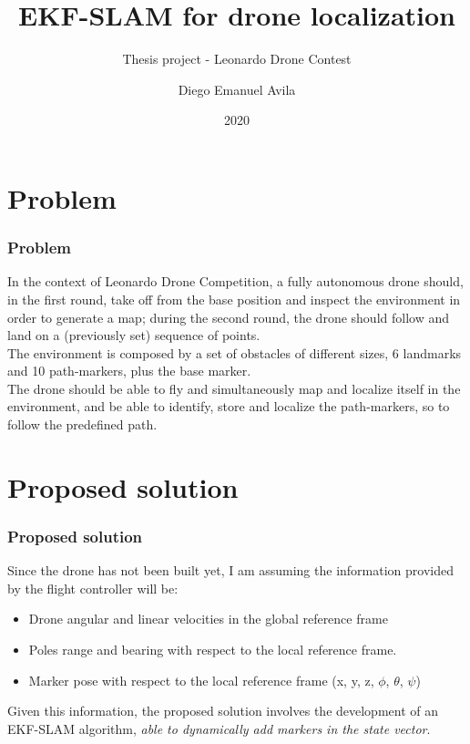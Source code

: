 \documentclass{beamer}
\title{EKF-SLAM for drone localization}
\subtitle{Thesis project - Leonardo Drone Contest}
\date{2020}
\author{Diego Emanuel Avila}
\begin{document}
    \begin{frame}
        \titlepage
    \end{frame}


    \begin{frame}
        \tableofcontents
    \end{frame}

    \section{Problem}
    \begin{frame}
        \justifying
        \frametitle{Problem}
        In the context of Leonardo Drone Competition, a fully autonomous drone should, in the first round, take off from the base position and inspect the environment in order to generate a map; during the second round, the drone should follow and land on a (previously set) sequence of points. \\[10pt]

        The environment is composed by a set of obstacles of different sizes, 6 landmarks and 10 path-markers, plus the  base marker. \\[10pt]

        The drone should be able to fly and simultaneously map and localize itself in the environment, and be able to identify, store and localize the path-markers, so to follow the predefined path.

    \end{frame}

    \section{Proposed solution}
    \begin{frame}

        \justifying
        \frametitle{Proposed solution}

        Since the drone has not been built yet, I am assuming the information provided by the flight controller will be: %
        \begin{itemize}
            \item{Drone angular and linear velocities in the global reference frame}
            \item{Poles range and bearing with respect to the local reference frame.}
            \item{Marker pose with respect to the local reference frame (x, y, z, $\phi$, $\theta$, $\psi$)}
        \end{itemize}

        Given this information, the proposed solution involves the development of an EKF-SLAM algorithm, \textit{able to dynamically add markers in the state vector}.

    \end{frame}
\end{document}

